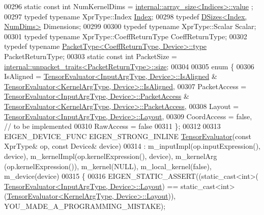 \begin{DoxyCode}
00296   \textcolor{keyword}{static} \textcolor{keyword}{const} \textcolor{keywordtype}{int} NumKernelDims = \hyperlink{struct_eigen_1_1internal_1_1array__size}{internal::array\_size<Indices>::value}
      ;
00297   \textcolor{keyword}{typedef} \textcolor{keyword}{typename} XprType::Index \hyperlink{namespace_eigen_a62e77e0933482dafde8fe197d9a2cfde}{Index};
00298   \textcolor{keyword}{typedef} \hyperlink{struct_eigen_1_1_d_sizes}{DSizes<Index, NumDims>} Dimensions;
00299 
00300   \textcolor{keyword}{typedef} \textcolor{keyword}{typename} XprType::Scalar Scalar;
00301   \textcolor{keyword}{typedef} \textcolor{keyword}{typename} XprType::CoeffReturnType CoeffReturnType;
00302   \textcolor{keyword}{typedef} \textcolor{keyword}{typename} \hyperlink{group___sparse_core___module}{PacketType<CoeffReturnType, Device>::type} 
      PacketReturnType;
00303   \textcolor{keyword}{static} \textcolor{keyword}{const} \textcolor{keywordtype}{int} PacketSize = 
      \hyperlink{struct_eigen_1_1internal_1_1unpacket__traits}{internal::unpacket\_traits<PacketReturnType>::size};
00304 
00305   \textcolor{keyword}{enum} \{
00306     IsAligned = \hyperlink{struct_eigen_1_1_tensor_evaluator}{TensorEvaluator<InputArgType, Device>::IsAligned}
       & \hyperlink{struct_eigen_1_1_tensor_evaluator}{TensorEvaluator<KernelArgType, Device>::IsAligned},
00307     PacketAccess = \hyperlink{struct_eigen_1_1_tensor_evaluator}{TensorEvaluator<InputArgType, Device>::PacketAccess}
       & \hyperlink{struct_eigen_1_1_tensor_evaluator}{TensorEvaluator<KernelArgType, Device>::PacketAccess},
00308     Layout = \hyperlink{struct_eigen_1_1_tensor_evaluator}{TensorEvaluator<InputArgType, Device>::Layout},
00309     CoordAccess = \textcolor{keyword}{false},  \textcolor{comment}{// to be implemented}
00310     RawAccess = \textcolor{keyword}{false}
00311   \};
00312 
00313   EIGEN\_DEVICE\_FUNC EIGEN\_STRONG\_INLINE \hyperlink{struct_eigen_1_1_tensor_evaluator}{TensorEvaluator}(\textcolor{keyword}{const} XprType& op, \textcolor{keyword}{const} Device& 
      device)
00314       : m\_inputImpl(op.inputExpression(), device), m\_kernelImpl(op.kernelExpression(), device), m\_kernelArg
      (op.kernelExpression()), m\_kernel(NULL), m\_local\_kernel(\textcolor{keyword}{false}), m\_device(device)
00315   \{
00316     EIGEN\_STATIC\_ASSERT((static\_cast<int>(
      \hyperlink{struct_eigen_1_1_tensor_evaluator}{TensorEvaluator<InputArgType, Device>::Layout}) == 
      static\_cast<int>(\hyperlink{struct_eigen_1_1_tensor_evaluator}{TensorEvaluator<KernelArgType, Device>::Layout})), 
      YOU\_MADE\_A\_PROGRAMMING\_MISTAKE);

\end{DoxyCode}
